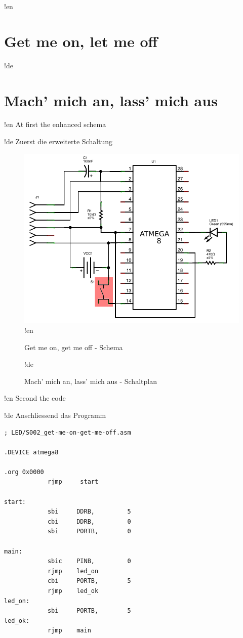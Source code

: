 !en \section{Get me on, let me off}
!de \section{Mach' mich an, lass' mich aus}

!en At first the enhanced schema

!de Zuerst die erweiterte Schaltung

\begin{figure}[htbp]
  \centering
  \includegraphics[width=120mm]{LED/S002_get-me-on-get-me-off_Circuit_schema.png}
!en   \caption{Get me on, get me off - Schema}
!de   \caption{Mach' mich an, lass' mich aus - Schaltplan}
  \label{atmega8-get-me-on-get-me-off-schema}
  \label{atmega8-get-me-on-get-me-off-schema}
\end{figure}


!en Second the code

!de Anschliessend das Programm


\begin{lstlisting}
; LED/S002_get-me-on-get-me-off.asm

.DEVICE atmega8

.org 0x0000
            rjmp     start

start:
            sbi     DDRB,         5
            cbi     DDRB,         0
            sbi     PORTB,        0

main:
            sbic    PINB,         0
            rjmp    led_on
            cbi     PORTB,        5
            rjmp    led_ok
led_on:
            sbi     PORTB,        5
led_ok:
            rjmp    main
\end{lstlisting}

